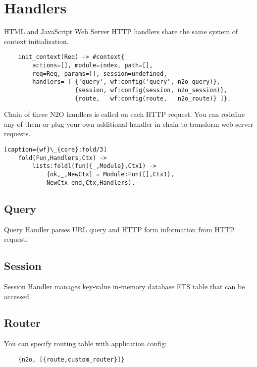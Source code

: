 
\section{Handlers}
HTML and JavaScript Web Server HTTP handlers share the same system
of context initialization. 

\vspace{1\baselineskip}
\begin{lstlisting}
    init_context(Req) -> #context{
        actions=[], module=index, path=[],
        req=Req, params=[], session=undefined,
        handlers= [ {'query', wf:config('query', n2o_query)},
                    {session, wf:config(session, n2o_session)},
                    {route,   wf:config(route,   n2o_route)} ]}.
\end{lstlisting}
\vspace{1\baselineskip}

Chain of three N2O handlers is called
on each HTTP request. You can redefine any of them or plug your own
additional handler in chain to transform web server requests.

\vspace{1\baselineskip}
\begin{lstlisting}[caption={wf}\_{core}:fold/3]
    fold(Fun,Handlers,Ctx) ->
        lists:foldl(fun({_,Module},Ctx1) ->
            {ok,_,NewCtx} = Module:Fun([],Ctx1),
            NewCtx end,Ctx,Handlers).
\end{lstlisting}
\vspace{1\baselineskip}

\subsection{Query}
Query Handler parses URL query and HTTP form information from HTTP request.

\subsection{Session}
Session Handler manages key-value in-memory database ETS table that can be accessed.

\newpage
\subsection{Router}
You can specify routing table with application config:

\vspace{1\baselineskip}
\begin{lstlisting}
    {n2o, [{route,custom_router}]}
\end{lstlisting}
\vspace{1\baselineskip}

